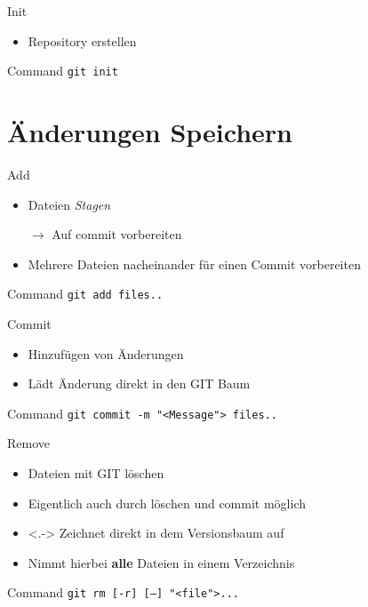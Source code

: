 \documentclass{beamer}
\begin{document}
    \begin{frame}{Init}
      \begin{itemize}
        \item Repository erstellen
      \end{itemize}
      \begin{block}{Command}
        \texttt{git init}
      \end{block}
    \end{frame}

    \section{Änderungen Speichern}

    \begin{frame}{Add}
      \begin{itemize}[<+->]
        \item Dateien \textit{Stagen}
        \item[$\rightarrow$] Auf commit vorbereiten
        \item Mehrere Dateien nacheinander für einen Commit vorbereiten
      \end{itemize}
      \begin{block}{Command}
        \texttt{git add files..}
      \end{block}
    \end{frame}

    \begin{frame}{Commit}
      \begin{itemize}
        \item Hinzufügen von Änderungen
        \item Lädt Änderung direkt in den GIT Baum
      \end{itemize}
      \begin{block}{Command}
        \texttt{git commit -m "<Message"> files..}
      \end{block}
    \end{frame}

    \begin{frame}{Remove}
      \begin{itemize}
        \item Dateien mit GIT löschen
        \item<+-> Eigentlich auch durch löschen und commit möglich
        \item<.-> Zeichnet direkt in dem Versionsbaum auf
        \item<+-|@alert> [-r] Nimmt hierbei \textbf{alle} Dateien in einem Verzeichnis
      \end{itemize}
      \begin{block}{Command}
        \texttt{git rm [-r] [--] "<file">...}
      \end{block}
    \end{frame}
\end{document}
